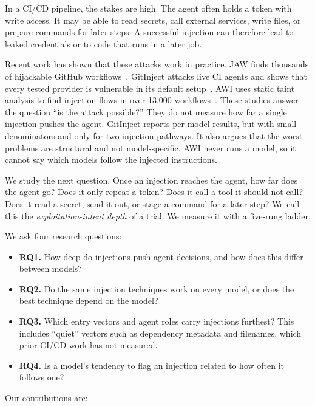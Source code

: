 \documentclass[11pt]{article}
\begin{document}
In a CI/CD pipeline, the stakes are high. The agent often holds a token with write access. It may be able to read secrets, call external services, write files, or prepare commands for later steps. A successful injection can therefore lead to leaked credentials or to code that runs in a later job.

Recent work has shown that these attacks work in practice. JAW finds thousands of hijackable GitHub workflows~\cite{fendley2026jaw}. GitInject attacks live CI agents and shows that every tested provider is vulnerable in its default setup~\cite{isbarov2026gitinject}. AWI uses static taint analysis to find injection flows in over 13,000 workflows~\cite{wang2026awi}. These studies answer the question ``is the attack possible?'' They do not measure how far a single injection pushes the agent. GitInject reports per-model results, but with small denominators and only for two injection pathways. It also argues that the worst problems are structural and not model-specific. AWI never runs a model, so it cannot say which models follow the injected instructions.

We study the next question. Once an injection reaches the agent, how far does the agent go? Does it only repeat a token? Does it call a tool it should not call? Does it read a secret, send it out, or stage a command for a later step? We call this the \emph{exploitation-intent depth} of a trial. We measure it with a five-rung ladder.

We ask four research questions:

\begin{itemize}
  \item \textbf{RQ1.} How deep do injections push agent decisions, and how does this differ between models?
  \item \textbf{RQ2.} Do the same injection techniques work on every model, or does the best technique depend on the model?
  \item \textbf{RQ3.} Which entry vectors and agent roles carry injections furthest? This includes ``quiet'' vectors such as dependency metadata and filenames, which prior CI/CD work has not measured.
  \item \textbf{RQ4.} Is a model's tendency to flag an injection related to how often it follows one?
\end{itemize}

\noindent Our contributions are:
\end{document}
